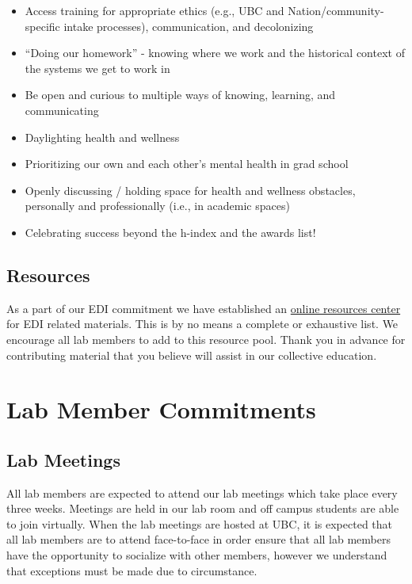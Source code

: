 \documentclass[
]{book}
\begin{document}
\begin{itemize}
\item
  Access training for appropriate ethics (e.g., UBC and Nation/community-specific intake processes), communication, and decolonizing
\item
  ``Doing our homework'' - knowing where we work and the historical context of the systems we get to work in
\item
  Be open and curious to multiple ways of knowing, learning, and communicating
\item
  Daylighting health and wellness
\item
  Prioritizing our own and each other's mental health in grad school
\item
  Openly discussing / holding space for health and wellness obstacles, personally and professionally (i.e., in academic spaces)
\item
  Celebrating success beyond the h-index and the awards list!
\end{itemize}

\hypertarget{ediresources}{%
\section*{Resources}\label{ediresources}}

As a part of our EDI commitment we have established an \href{https://docs.google.com/document/d/102fsqZL8UVf22TX1kTZ1WjQu2U9SrFjEBbQ9NipedXA/edit\#heading=h.axugsem4agey}{online resources center} for EDI related materials. This is by no means a complete or exhaustive list. We encourage all lab members to add to this resource pool. Thank you in advance for contributing material that you believe will assist in our collective education.

\hypertarget{lab-member-commitments}{%
\chapter{Lab Member Commitments}\label{lab-member-commitments}}

\hypertarget{lab-meetings}{%
\section{Lab Meetings}\label{lab-meetings}}

All lab members are expected to attend our lab meetings which take place every three weeks. Meetings are held in our lab room and off campus students are able to join virtually. When the lab meetings are hosted at UBC, it is expected that all lab members are to attend face-to-face in order ensure that all lab members have the opportunity to socialize with other members, however we understand that exceptions must be made due to circumstance.
\end{document}
